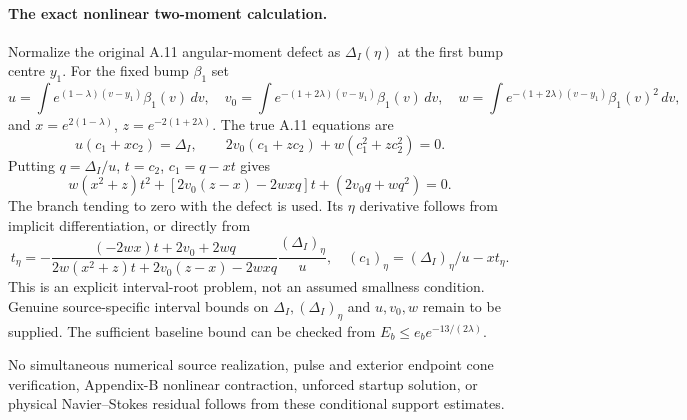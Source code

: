 \paragraph{The exact nonlinear two-moment calculation.}
Normalize the original A.11 angular-moment defect as
$\Delta_I(\eta)$ at the first bump centre $y_1$.
For the fixed bump $\beta_1$ set
\[
u=\int e^{(1-\lambda)(v-y_1)}\beta_1(v)\,dv,\quad
v_0=\int e^{-(1+2\lambda)(v-y_1)}\beta_1(v)\,dv,\quad
w=\int e^{-(1+2\lambda)(v-y_1)}\beta_1(v)^2\,dv,
\]
and $x=e^{2(1-\lambda)}$, $z=e^{-2(1+2\lambda)}$.
The true A.11 equations are
\[
u(c_1+xc_2)=\Delta_I,\qquad
2v_0(c_1+zc_2)+w(c_1^2+zc_2^2)=0.
\]
Putting $q=\Delta_I/u$, $t=c_2$, $c_1=q-xt$ gives
\[
w(x^2+z)t^2+
[2v_0(z-x)-2wxq]t+(2v_0q+wq^2)=0.
\]
The branch tending to zero with the defect is used.
Its $\eta$ derivative follows from implicit differentiation,
or directly from
\[
t_\eta=
-\frac{(-2wx)t+2v_0+2wq}
 {2w(x^2+z)t+2v_0(z-x)-2wxq}
 \frac{(\Delta_I)_\eta}{u},
\quad(c_1)_\eta=(\Delta_I)_\eta/u-xt_\eta.
\]
This is an explicit interval-root problem, not an
assumed smallness condition. Genuine source-specific interval
bounds on $\Delta_I,(\Delta_I)_\eta$ and $u,v_0,w$ remain to be
supplied. The sufficient baseline bound can be checked from
$E_b\le e_b e^{-13/(2\lambda)}$.

No simultaneous numerical source realization, pulse and exterior
endpoint cone verification, Appendix-B nonlinear contraction,
unforced startup solution, or physical Navier--Stokes residual
follows from these conditional support estimates.